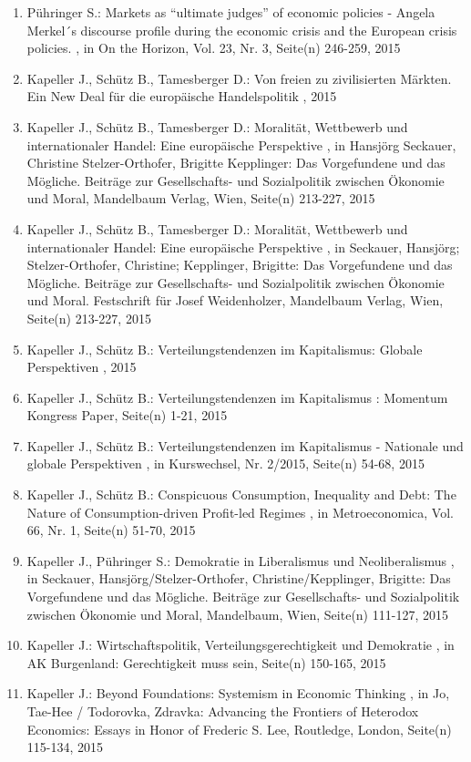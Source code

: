 \begin{enumerate}[leftmargin=*, labelsep=0.5cm]
	 \item Pühringer S.:  Markets as “ultimate judges” of economic policies - Angela Merkel´s discourse profile during the economic crisis and the European crisis policies.  , in On the Horizon, Vol. 23, Nr. 3, Seite(n) 246-259, 2015
	 \item Kapeller J., Schütz B., Tamesberger D.:  Von freien zu zivilisierten Märkten. Ein New Deal für die europäische Handelspolitik  , 2015
	 \item Kapeller J., Schütz B., Tamesberger D.:  Moralität, Wettbewerb und internationaler Handel: Eine europäische Perspektive  , in Hansjörg Seckauer, Christine Stelzer-Orthofer, Brigitte Kepplinger: Das Vorgefundene und das Mögliche. Beiträge zur Gesellschafts- und Sozialpolitik zwischen Ökonomie und Moral, Mandelbaum Verlag, Wien, Seite(n) 213-227, 2015
	 \item Kapeller J., Schütz B., Tamesberger D.:  Moralität, Wettbewerb und internationaler Handel: Eine europäische Perspektive  , in Seckauer, Hansjörg; Stelzer-Orthofer, Christine; Kepplinger, Brigitte: Das Vorgefundene und das Mögliche. Beiträge zur Gesellschafts- und Sozialpolitik zwischen Ökonomie und Moral. Festschrift für Josef Weidenholzer, Mandelbaum Verlag, Wien, Seite(n) 213-227, 2015
	 \item Kapeller J., Schütz B.:  Verteilungstendenzen im Kapitalismus: Globale Perspektiven  , 2015
	 \item Kapeller J., Schütz B.:  Verteilungstendenzen im Kapitalismus  : Momentum Kongress Paper, Seite(n) 1-21, 2015
	 \item Kapeller J., Schütz B.:  Verteilungstendenzen im Kapitalismus - Nationale und globale Perspektiven  , in Kurswechsel, Nr. 2/2015, Seite(n) 54-68, 2015
	 \item Kapeller J., Schütz B.:  Conspicuous Consumption, Inequality and Debt: The Nature of Consumption-driven Profit-led Regimes  , in Metroeconomica, Vol. 66, Nr. 1, Seite(n) 51-70, 2015
	 \item Kapeller J., Pühringer S.:  Demokratie in Liberalismus und Neoliberalismus  , in Seckauer, Hansjörg/Stelzer-Orthofer, Christine/Kepplinger, Brigitte: Das Vorgefundene und das Mögliche. Beiträge zur Gesellschafts- und Sozialpolitik zwischen Ökonomie und Moral, Mandelbaum, Wien, Seite(n) 111-127, 2015
	 \item Kapeller J.:  Wirtschaftspolitik, Verteilungsgerechtigkeit und Demokratie  , in AK Burgenland: Gerechtigkeit muss sein, Seite(n) 150-165, 2015
	 \item Kapeller J.:  Beyond Foundations: Systemism in Economic  Thinking  , in Jo, Tae-Hee / Todorovka, Zdravka: Advancing the Frontiers of Heterodox Economics: Essays in Honor of Frederic S. Lee, Routledge, London, Seite(n) 115-134, 2015

\end{enumerate}

